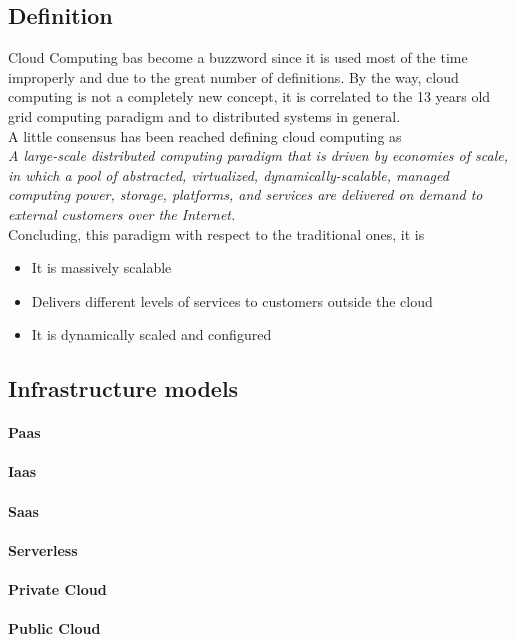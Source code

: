 \subsection{Definition}
Cloud Computing bas become a buzzword since it is used most of the time improperly and due to the great number of definitions. By the way, cloud computing is not a completely new concept, it is correlated to the 13 years old grid computing paradigm and to distributed systems in general.\cite{foster}\\
A little consensus has been reached defining cloud computing as\\
\textit{A large-scale distributed computing paradigm that is driven by economies of scale, in which a pool of abstracted, virtualized, dynamically-scalable, managed computing power, storage, platforms, and services are delivered on demand to external customers over the Internet.}\\
Concluding, this paradigm with respect to the traditional ones, it is
\begin{itemize}
    \item It is massively scalable
    \item Delivers different levels of services to customers outside the cloud
    \item It is dynamically scaled and configured
\end{itemize}
\cite{foster}

\subsection{Infrastructure models}
\paragraph{Paas}
\paragraph{Iaas}
\paragraph{Saas}
\paragraph{Serverless}
\paragraph{Private Cloud}
\paragraph{Public Cloud}
